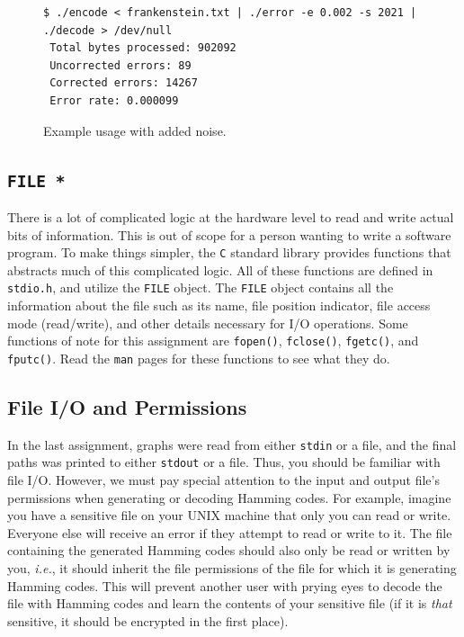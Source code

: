 \documentclass[11pt]{article}
\begin{document}
\begin{figure}[h]
\begin{centering}
  \begin{lstlisting}[style=bashstyle]
 $ ./encode < frankenstein.txt | ./error -e 0.002 -s 2021 | ./decode > /dev/null
 Total bytes processed: 902092
 Uncorrected errors: 89
 Corrected errors: 14267
 Error rate: 0.000099\end{lstlisting}
  \caption{Example usage with added noise.}
\end{centering}
\end{figure}

\subsection{\texttt{FILE *}}

There is a lot of complicated logic at the hardware level to read and
write actual bits of information. This is out of scope for a person
wanting to write a software program. To make things simpler, the
\texttt{C} standard library provides functions that abstracts much of
this complicated logic. All of these functions are defined in
\texttt{stdio.h}, and utilize the \texttt{FILE} object. The
\texttt{FILE} object contains all the information about the file such as
its name, file position indicator, file access mode (read/write), and
other details necessary for I/O operations. Some functions of note for
this assignment are \texttt{fopen()}, \texttt{fclose()},
\texttt{fgetc()}, and \texttt{fputc()}. Read the \texttt{man} pages for
these functions to see what they do.

\subsection{File I/O and Permissions}

In the last assignment, graphs were read from either \texttt{stdin} or a
file, and the final paths was printed to either \texttt{stdout} or a
file. Thus, you should be familiar with file I/O. However, we must pay
special attention to the input and output file's permissions when
generating or decoding Hamming codes. For example, imagine you have a
sensitive file on your \textsc{UNIX} machine that only you can read or
write. Everyone else will receive an error if they attempt to read or
write to it. The file containing the generated Hamming codes should also
only be read or written by you, \textit{i.e.}, it should inherit the
file permissions of the file for which it is generating Hamming codes.
This will prevent another user with prying eyes to decode the file with
Hamming codes and learn the contents of your sensitive file (if it is
\emph{that} sensitive, it should be encrypted in the first place).
\end{document}
